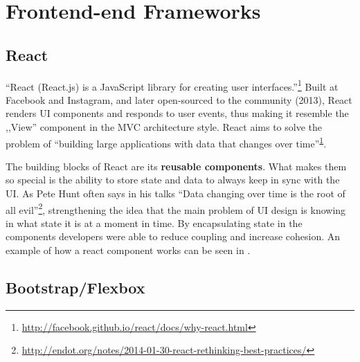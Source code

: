 \section{Frontend-end Frameworks}
\label{sec:frontend}

\subsection{React}
\label{sub-sec:react}

``React (React.js) is a JavaScript library for creating user interfaces.''\footnote{\label{why-react}\url{http://facebook.github.io/react/docs/why-react.html}} Built at Facebook and Instagram, and later open-sourced to the community (2013), React renders UI components and responds to user events, thus making it resemble the ,,View'' component in the MVC architecture style. React aims to solve the problem of ``building large applications with data that changes over time''\textsuperscript{\ref{why-react}}.

The building blocks of React are its \textbf{reusable components}. What makes them so special is the ability to store state and data to always keep in sync with the UI. As Pete Hunt often says in his talks ``Data changing over time is the root of all evil''\footnote{\url{http://endot.org/notes/2014-01-30-react-rethinking-best-practices/}}, strengthening the idea that the main problem of UI design is knowing in what state it is at a moment in time. By encapsulating state in the components developers were able to reduce coupling and increase cohesion. An example of how a react component works can be seen in .










\subsection{Bootstrap/Flexbox}
\label{sub-sec:bootstrap}

